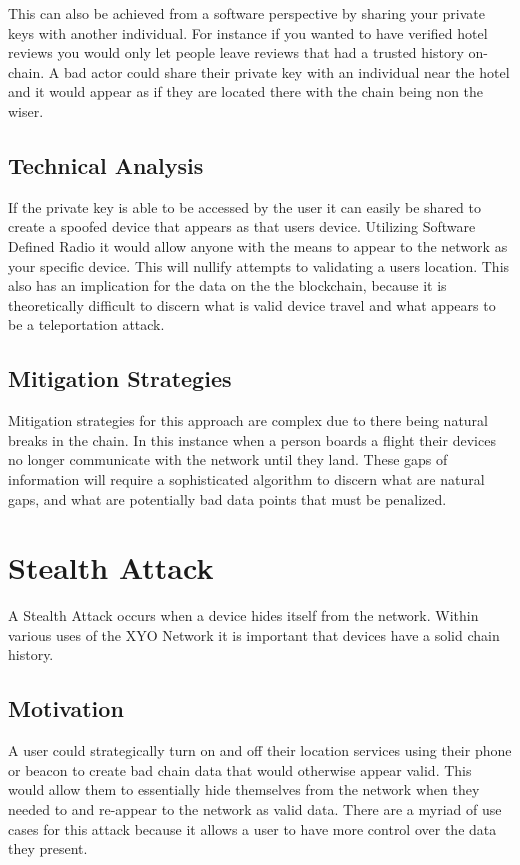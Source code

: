 \documentclass{article}
\begin{document}
This can also be achieved from a software perspective by sharing your private keys with another individual. For instance if you wanted to have verified hotel reviews you would only let people leave reviews that had a trusted history on-chain. A bad actor could share their private key with an individual near the hotel and it would appear as if they are located there with the chain being non the wiser. 

\subsection{Technical Analysis}
If the private key is able to be accessed by the user it can easily be shared to create a spoofed device that appears as that users device. Utilizing Software Defined Radio it would allow anyone with the means to appear to the network as your specific device. This will nullify attempts to validating a users location. This also has an implication for the data on the the blockchain, because it is theoretically difficult to discern what is valid device travel and what appears to be a teleportation attack. 

\subsection{Mitigation Strategies}
Mitigation strategies for this approach are complex due to there being natural breaks in the chain. In this instance when a person boards a flight their devices no longer communicate with the network until they land. These gaps of information will require a sophisticated algorithm to discern what are natural gaps, and what are potentially bad data points that must be penalized. 

\section{Stealth Attack}
A Stealth Attack occurs when a device hides itself from the network. Within various uses of the XYO Network it is important that devices have a solid chain history. 

\subsection{Motivation}
A user could strategically turn on and off their location services using their phone or beacon to create bad chain data that would otherwise appear valid. This would allow them to essentially hide themselves from the network when they needed to and re-appear to the network as valid data. There are a myriad of use cases for this attack because it allows a user to have more control over the data they present.
\end{document}
